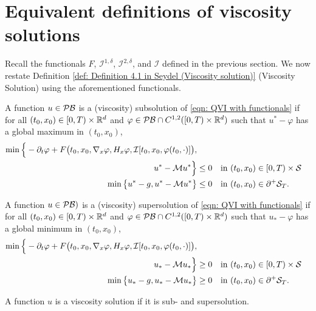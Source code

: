 \section{Equivalent definitions of viscosity solutions}
\label{section: Equivalent Definitions of Viscosity Solutions}
Recall the functionals $F$, $\mathcal{I}^{1,\delta}$, $\mathcal{I}^{2,\delta}$, and $\mathcal{I}$ defined in the previous section. We now restate Definition \ref{def: Definition 4.1 in Seydel (Viscosity solution)} (Viscosity Solution) using the aforementioned functionals. 

\begin{definition}
\label{def: Viscosity solution 1}
    A function $u \in \mathcal{PB}$ is a (viscosity) subsolution of \eqref{eqn: QVI with functionals} if for all $(t_0,x_0) \in [0,T) \times \mathbb{R}^d$ and $\varphi \in \mathcal{PB} \cap C^{1,2}([0,T) \times \mathbb{R}^d)$ such that $u^* - \varphi$ has a global maximum in $(t_0,x_0)$, 
    \begin{align*}
        \min \Big\{ - \partial_t \varphi + F\big(t_0,x_0,\nabla_x \varphi, H_x \varphi, \mathcal{I}[t_0,x_0,\varphi(t_0,\cdot)] \big), \\
        u^* - \mathcal{M} u^* \Big\} &\leq 0 \quad \text{in } (t_0,x_0) \in [0,T) \times \mathcal{S} \\
        \min \big\{ u^* - g, u^* - \mathcal{M} u^* \big\} & \leq 0 \quad \text{in } (t_0,x_0) \in \partial^+ \mathcal{S}_T.
    \end{align*}

    A function $u \in \mathcal{PB})$ is a (viscosity) supersolution of \eqref{eqn: QVI with functionals} if for all $(t_0,x_0) \in [0,T) \times \mathbb{R}^d$ and $\varphi \in \mathcal{PB} \cap C^{1,2}([0,T) \times \mathbb{R}^d)$ such that $u_* - \varphi$ has a global minimum in $(t_0,x_0)$, 
    \begin{align*}
        \min \Big\{ - \partial_t \varphi + F\big(t_0,x_0, \nabla_x \varphi, H_x \varphi, \mathcal{I}[t_0,x_0,\varphi(t_0,\cdot)] \big), \\
        u_* - \mathcal{M} u_* \Big\} &\geq 0 \quad \text{in } (t_0,x_0) \in [0,T) \times \mathcal{S} \\
        \min \big\{ u_* - g, u_* - \mathcal{M} u_* \big\} & \geq 0 \quad \text{in } (t_0,x_0) \in \partial^+ \mathcal{S}_T.
    \end{align*}

    A function $u$ is a viscosity solution if it is sub- and supersolution. 
\end{definition}


